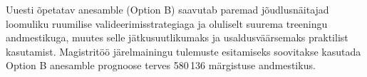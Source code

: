 Uuesti õpetatav anesamble (Option B) saavutab paremad jõudlusnäitajad
loomuliku ruumilise valideerimisstrategiaga ja oluliselt suurema treeningu
andmestikuga, muutes selle jätkusuutlikumaks ja usaldusväärsemaks praktilist
kasutamist. Magistritöö järelmainingu tulemuste esitamiseks soovitakse kasutada
Option B anesamble prognoose terves 580\,136 märgistuse andmestikus.
